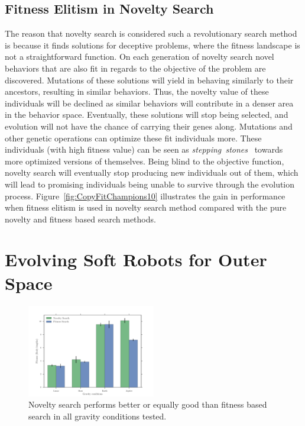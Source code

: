 \documentclass{sig-alternate}
\begin{document}
\subsection{Fitness Elitism in Novelty Search}

The reason that novelty search is considered such a revolutionary search method is because it finds solutions for deceptive problems, where the fitness landscape is not a straightforward function. On each generation of novelty search novel behaviors that are also fit in regards to the objective of the problem are discovered. Mutations of these solutions will yield in behaving similarly to their ancestors, resulting in similar behaviors. Thus, the novelty value of these individuals will be declined as similar behaviors will contribute in a denser area in the behavior space. Eventually, these solutions will stop being selected, and evolution will not have the chance of carrying their genes along. Mutations and other genetic operations can optimize these fit individuals more. These individuals (with high fitness value) can be seen as \emph{stepping~stones}~\cite{lehman2011abandoning} towards more optimized versions of themselves. Being blind to the objective function, novelty search will eventually stop producing new individuals out of them, which will lead to promising individuals being unable to survive through the evolution process. Figure~\ref{fig:CopyFitChampions10} illustrates the gain in performance when fitness elitism is used in novelty search method compared with the pure novelty and fitness based search methods.


\section{Evolving Soft Robots for Outer Space} 

\begin{figure}[b!]
\centering
\includegraphics[width=0.5\textwidth]{../Figures/Results/GravityExperiment.pdf}
\caption{Novelty search performs better or equally good than fitness based search in all gravity conditions tested.}
\label{fig:gravityConditions}
\vspace{-15pt}
\end{figure}
\end{document}
